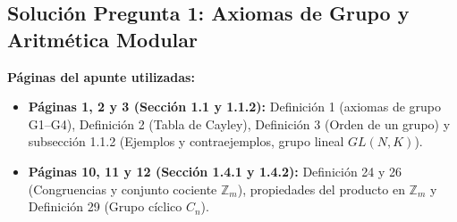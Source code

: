 \documentclass[11pt, a4paper]{article}
\begin{document}
\subsection*{\textcolor{primary}{Solución Pregunta 1: Axiomas de Grupo y Aritmética Modular}}
\textbf{Páginas del apunte utilizadas:}
\begin{itemize}
    \item \textbf{Páginas 1, 2 y 3 (Sección 1.1 y 1.1.2):} Definición 1 (axiomas de grupo G1--G4), Definición 2 (Tabla de Cayley), Definición 3 (Orden de un grupo) y subsección 1.1.2 (Ejemplos y contraejemplos, grupo lineal $GL(N,K)$).
    \item \textbf{Páginas 10, 11 y 12 (Sección 1.4.1 y 1.4.2):} Definición 24 y 26 (Congruencias y conjunto cociente $\mathbb{Z}_m$), propiedades del producto en $\mathbb{Z}_m$ y Definición 29 (Grupo cíclico $C_n$).
\end{itemize}
\end{document}
